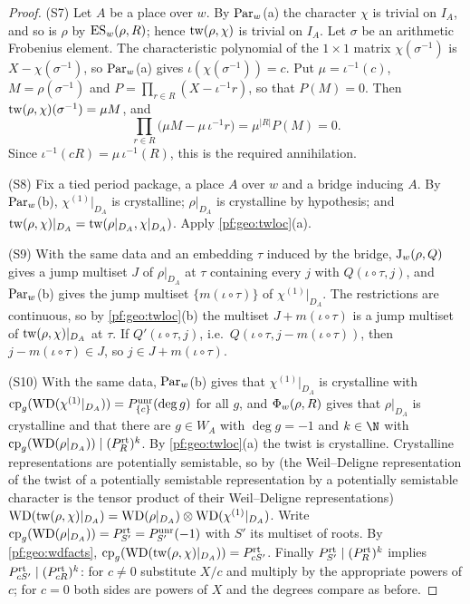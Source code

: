 \begin{proof}
(S7) Let $A$ be a place over $w$. By $\mathrm{Par}_w$(a) the character $\chi$ is trivial on $I_A$, and so is
$\rho$ by $\mathrm{ES}_w(\rho,R)$; hence $\mathrm{tw}(\rho,\chi)$ is trivial on $I_A$. Let $\sigma$ be an arithmetic
Frobenius element. The characteristic polynomial of the $1\times1$ matrix $\chi(\sigma^{-1})$ is
$X-\chi(\sigma^{-1})$, so $\mathrm{Par}_w$(a) gives $\iota(\chi(\sigma^{-1}))=c$. Put $\mu=\iota^{-1}(c)$, $M=\rho(\sigma^{-1})$ and
$P=\prod_{r\in R}(X-\iota^{-1}r)$, so that $P(M)=0$. Then $\mathrm{tw}(\rho,\chi)(\sigma^{-1})=\mu M$, and
\[
  \prod_{r\in R}\bigl(\mu M-\mu\,\iota^{-1}r\bigr)=\mu^{|R|}P(M)=0 .
\]
Since $\iota^{-1}(cR)=\mu\,\iota^{-1}(R)$, this is the required annihilation.

(S8) Fix a tied period package, a place $A$ over $w$ and a bridge inducing $A$. By $\mathrm{Par}_w$(b),
$\chi^{(1)}|_{D_A}$ is crystalline; $\rho|_{D_A}$ is crystalline by hypothesis; and
$\mathrm{tw}(\rho,\chi)|_{D_A}=\mathrm{tw}(\rho|_{D_A},\chi|_{D_A})$. Apply \cref{pf:geo:twloc}(a).

(S9) With the same data and an embedding $\tau$ induced by the bridge, $\mathrm{J}_w(\rho,Q)$ gives a jump
multiset $J$ of $\rho|_{D_A}$ at $\tau$ containing every $j$ with $Q(\iota\circ\tau,j)$, and $\mathrm{Par}_w$(b) gives
the jump multiset $\{m(\iota\circ\tau)\}$ of $\chi^{(1)}|_{D_A}$. The restrictions are continuous, so by
\cref{pf:geo:twloc}(b) the multiset $J+m(\iota\circ\tau)$ is a jump multiset of $\mathrm{tw}(\rho,\chi)|_{D_A}$ at $\tau$. If
$Q'(\iota\circ\tau,j)$, i.e.\ $Q(\iota\circ\tau,j-m(\iota\circ\tau))$, then $j-m(\iota\circ\tau)\in J$, so $j\in J+m(\iota\circ\tau)$.

(S10) With the same data, $\mathrm{Par}_w$(b) gives that $\chi^{(1)}|_{D_A}$ is crystalline with
$\mathrm{cp}_g(\mathrm{WD}(\chi^{(1)}|_{D_A}))=P^{\mathrm{unr}}_{\{c\}}(\deg g)$ for all $g$, and $\Phi_w(\rho,R)$ gives that
$\rho|_{D_A}$ is crystalline and that there are $g\in W_A$ with $\deg g=-1$ and $k\in\N$ with
$\mathrm{cp}_g(\mathrm{WD}(\rho|_{D_A}))\mid(P^{\mathrm{rt}}_R)^k$. By \cref{pf:geo:twloc}(a) the twist is crystalline. Crystalline
representations are potentially semistable, so by
 (the Weil--Deligne
representation of the twist of a potentially semistable representation by a potentially semistable
character is the tensor product of their Weil--Deligne representations)
$\mathrm{WD}(\mathrm{tw}(\rho,\chi)|_{D_A})=\mathrm{WD}(\rho|_{D_A})\otimes\mathrm{WD}(\chi^{(1)}|_{D_A})$. Write
$\mathrm{cp}_g(\mathrm{WD}(\rho|_{D_A}))=P^{\mathrm{rt}}_{S'}=P^{\mathrm{unr}}_{S'}(-1)$ with $S'$ its multiset of roots. By
\cref{pf:geo:wdfacts}, $\mathrm{cp}_g(\mathrm{WD}(\mathrm{tw}(\rho,\chi)|_{D_A}))=P^{\mathrm{rt}}_{cS'}$. Finally
$P^{\mathrm{rt}}_{S'}\mid(P^{\mathrm{rt}}_R)^k$ implies $P^{\mathrm{rt}}_{cS'}\mid(P^{\mathrm{rt}}_{cR})^k$: for $c\ne0$ substitute $X/c$ and multiply by
the appropriate powers of $c$; for $c=0$ both sides are powers of $X$ and the degrees compare as
before.
\end{proof}

